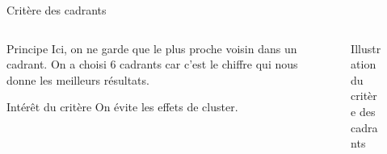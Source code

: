 \begin{frame}{Critère des cadrants}
    \begin{columns}
        \begin{column}{0.4\paperwidth}
            \begin{block}{Principe}
                Ici, on ne garde que le plus proche voisin dans un cadrant. On a choisi 6 cadrants car c'est le chiffre qui nous donne les meilleurs résultats.
            \end{block}
            \begin{block}{Intérêt du critère}
                On évite les effets de cluster.
            \end{block}
        \end{column}
        \begin{column}{0.55\paperwidth}
            \begin{figure}
                \caption{\label{fig:cadrants_crit}Illustration du critère des cadrants}
            \end{figure}
        \end{column}
    \end{columns}
\end{frame}

